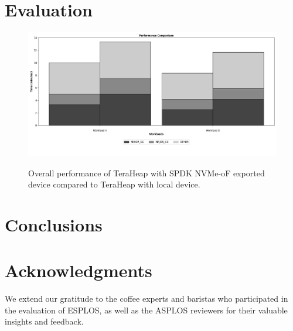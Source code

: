\documentclass[nonacm,sigplan]{acmart}
\begin{document}
\section{Evaluation}
\begin{figure}[H]
  \includegraphics[width=\linewidth]{../pyPlot_Groups/plot.png}\\
\caption{Overall performance of TeraHeap with SPDK NVMe-oF exported device compared to TeraHeap with local device.}
\label{fig:plot_spark}
\end{figure}
\section{Conclusions}

\section{Acknowledgments}
We extend our gratitude to the coffee experts and baristas who participated in the evaluation of ESPLOS, as well as the ASPLOS reviewers for their valuable insights and feedback.



\end{document}
